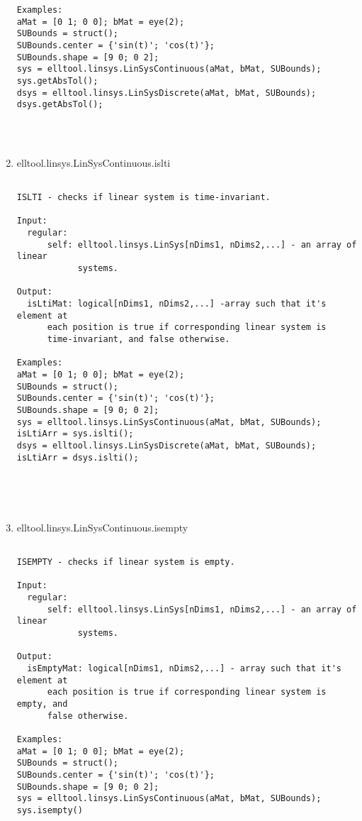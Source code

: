 \begin{enumerate}
\begin{lstlisting}
Examples:
aMat = [0 1; 0 0]; bMat = eye(2);
SUBounds = struct();
SUBounds.center = {'sin(t)'; 'cos(t)'};
SUBounds.shape = [9 0; 0 2];
sys = elltool.linsys.LinSysContinuous(aMat, bMat, SUBounds);
sys.getAbsTol();
dsys = elltool.linsys.LinSysDiscrete(aMat, bMat, SUBounds);
dsys.getAbsTol();




\end{lstlisting}
\fontfamily{\familydefault}
\selectfont
\item {elltool.linsys.LinSysContinuous.islti}
\selectfont
\begin{lstlisting}

ISLTI - checks if linear system is time-invariant.

Input:
  regular:
      self: elltool.linsys.LinSys[nDims1, nDims2,...] - an array of linear
            systems.

Output:
  isLtiMat: logical[nDims1, nDims2,...] -array such that it's element at
      each position is true if corresponding linear system is
      time-invariant, and false otherwise.

Examples:
aMat = [0 1; 0 0]; bMat = eye(2);
SUBounds = struct();
SUBounds.center = {'sin(t)'; 'cos(t)'};
SUBounds.shape = [9 0; 0 2];
sys = elltool.linsys.LinSysContinuous(aMat, bMat, SUBounds);
isLtiArr = sys.islti();
dsys = elltool.linsys.LinSysDiscrete(aMat, bMat, SUBounds);
isLtiArr = dsys.islti();





\end{lstlisting}
\fontfamily{\familydefault}
\selectfont
\item {elltool.linsys.LinSysContinuous.isempty}
\selectfont
\begin{lstlisting}

ISEMPTY - checks if linear system is empty.

Input:
  regular:
      self: elltool.linsys.LinSys[nDims1, nDims2,...] - an array of linear
            systems.

Output:
  isEmptyMat: logical[nDims1, nDims2,...] - array such that it's element at
      each position is true if corresponding linear system is empty, and
      false otherwise.

Examples:
aMat = [0 1; 0 0]; bMat = eye(2);
SUBounds = struct();
SUBounds.center = {'sin(t)'; 'cos(t)'};
SUBounds.shape = [9 0; 0 2];
sys = elltool.linsys.LinSysContinuous(aMat, bMat, SUBounds);
sys.isempty()


\end{lstlisting}
\end{enumerate}
